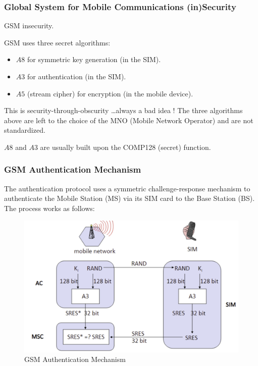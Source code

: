 \subsubsection{Global System for Mobile Communications (in)Security}
\begin{center}
    GSM insecurity.
\end{center}
GSM uses three secret algorithms:
\begin{itemize}
    \item $A8$ for symmetric key generation (in the SIM).
    \item $A3$ for authentication (in the SIM).
    \item $A5$ (stream cipher) for encryption (in the mobile device).
\end{itemize}
This is security-through-obscurity \dots always a bad idea !
The three algorithms above are left to the choice of the MNO (Mobile Network Operator) and are not standardized.
\begin{tcolorbox}[colback=blue!10!white, colframe=blue!50!white]
$A8$ and $A3$ are usually built upon the COMP128 (secret) function.
\end{tcolorbox}

\clearpage
\subsubsection*{GSM Authentication Mechanism}
\begin{multicols}{2}

    The authentication protocol uses a symmetric challenge-response mechanism to authenticate the Mobile Station (MS) via its SIM card to the Base Station (BS). The process works as follows:
\columnbreak

    \begin{figure}[H]
        \centering
        \includegraphics[width=\linewidth]{Images/Authentication/gsm_authn.png}
        \caption{GSM Authentication Mechanism}
    \end{figure}
\end{multicols}

